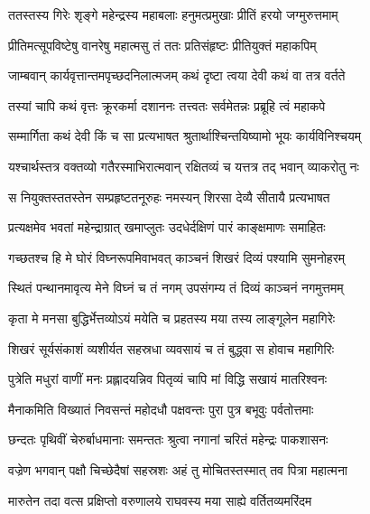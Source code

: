 
\twolineshloka
{ततस्तस्य गिरेः शृङ्गे महेन्द्रस्य महाबलाः}
{हनुमत्प्रमुखाः प्रीतिं हरयो जग्मुरुत्तमाम्} %

\twolineshloka
{प्रीतिमत्सूपविष्टेषु वानरेषु महात्मसु}
{तं ततः प्रतिसंहृष्टः प्रीतियुक्तं महाकपिम्} %

\twolineshloka
{जाम्बवान् कार्यवृत्तान्तमपृच्छदनिलात्मजम्}
{कथं दृष्टा त्वया देवी कथं वा तत्र वर्तते} %

\twolineshloka
{तस्यां चापि कथं वृत्तः क्रूरकर्मा दशाननः}
{तत्त्वतः सर्वमेतन्नः प्रब्रूहि त्वं महाकपे} %

\twolineshloka
{सम्मार्गिता कथं देवी किं च सा प्रत्यभाषत}
{श्रुतार्थाश्चिन्तयिष्यामो भूयः कार्यविनिश्चयम्} %

\twolineshloka
{यश्चार्थस्तत्र वक्तव्यो गतैरस्माभिरात्मवान्}
{रक्षितव्यं च यत्तत्र तद् भवान् व्याकरोतु नः} %

\twolineshloka
{स नियुक्तस्ततस्तेन सम्प्रहृष्टतनूरुहः}
{नमस्यन् शिरसा देव्यै सीतायै प्रत्यभाषत} %

\twolineshloka
{प्रत्यक्षमेव भवतां महेन्द्राग्रात् खमाप्लुतः}
{उदधेर्दक्षिणं पारं काङ्क्षमाणः समाहितः} %

\twolineshloka
{गच्छतश्च हि मे घोरं विघ्नरूपमिवाभवत्}
{काञ्चनं शिखरं दिव्यं पश्यामि सुमनोहरम्} %

\twolineshloka
{स्थितं पन्थानमावृत्य मेने विघ्नं च तं नगम्}
{उपसंगम्य तं दिव्यं काञ्चनं नगमुत्तमम्} %

\twolineshloka
{कृता मे मनसा बुद्धिर्भेत्तव्योऽयं मयेति च}
{प्रहतस्य मया तस्य लाङ्गूलेन महागिरेः} %

\twolineshloka
{शिखरं सूर्यसंकाशं व्यशीर्यत सहस्रधा}
{व्यवसायं च तं बुद्ध्वा स होवाच महागिरिः} %

\twolineshloka
{पुत्रेति मधुरां वाणीं मनः प्रह्लादयन्निव}
{पितृव्यं चापि मां विद्धि सखायं मातरिश्वनः} %

\twolineshloka
{मैनाकमिति विख्यातं निवसन्तं महोदधौ}
{पक्षवन्तः पुरा पुत्र बभूवुः पर्वतोत्तमाः} %

\twolineshloka
{छन्दतः पृथिवीं चेरुर्बाधमानाः समन्ततः}
{श्रुत्वा नगानां चरितं महेन्द्रः पाकशासनः} %

\twolineshloka
{वज्रेण भगवान् पक्षौ चिच्छेदैषां सहस्रशः}
{अहं तु मोचितस्तस्मात् तव पित्रा महात्मना} %

\twolineshloka
{मारुतेन तदा वत्स प्रक्षिप्तो वरुणालये}
{राघवस्य मया साह्ये वर्तितव्यमरिंदम} %

